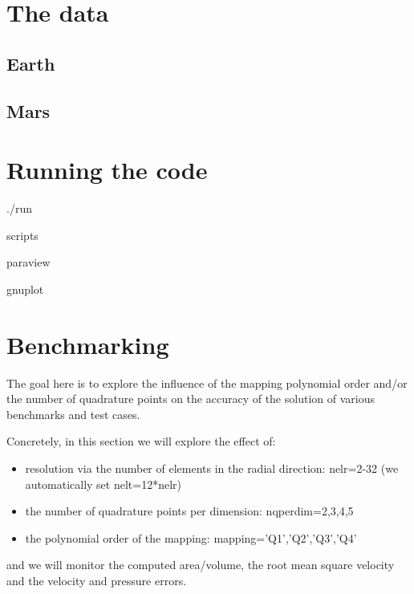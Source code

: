 \documentclass[a4paper,12pt]{article}
\newcommand{\python}{\color{teal} \sffamily }
\begin{document}
\section{The data}

\subsection{Earth}


\subsection{Mars}

\newpage
\section{Running the code}

./run

scripts

paraview

gnuplot


\newpage
\section{Benchmarking}



The goal here is to explore the influence of the mapping polynomial order and/or
the number of quadrature points on the accuracy of the solution of various benchmarks and test cases.

Concretely, in this section we will explore the effect of:
\begin{itemize}
\item resolution via the number of elements in the radial direction: {\python nelr=2-32} (we automatically set {\python nelt=12*nelr})
\item the number of quadrature points per dimension: {\python nqperdim=2,3,4,5}
\item the polynomial order of the mapping: {\python mapping='Q1','Q2','Q3','Q4'}
\end{itemize}
and we will monitor the computed area/volume, the root mean square velocity and the velocity and pressure errors.
\end{document}
